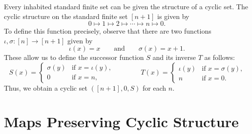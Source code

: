 \begin{example}\label{example:standard-finite-cyclic-sets}
  Every inhabited standard finite set can be given the structure of a cyclic set. The cyclic structure on the standard finite set $[n+1]$ is given by
  \begin{equation*}
    0\mapsto 1 \mapsto 2 \mapsto \cdots \mapsto n \mapsto 0.
  \end{equation*}
  To define this function precisely, observe that there are two functions $\iota,\sigma:[n]\to[n+1]$ given by
  \begin{equation*}
    \iota(x)=x\qquad\text{and}\qquad \sigma(x)=x+1.
  \end{equation*}
  These allow us to define the successor function $S$ and its inverse $T$ as follows:
  \begin{equation*}
    S(x)=
    \begin{cases}
      \sigma(y) & \text{if $x = \iota(y)$,} \\
      0    & \text{if $x = n$,}
    \end{cases}
    \qquad\qquad
    T(x)=
    \begin{cases}
      \iota(y) & \text{if $x = \sigma(y)$,} \\
      n & \text{if $x = 0$.}
    \end{cases}
  \end{equation*}
  Thus, we obtain a cyclic set $([n+1],0,S)$ for each $n$.
\end{example}

\section{Maps Preserving Cyclic Structure}

